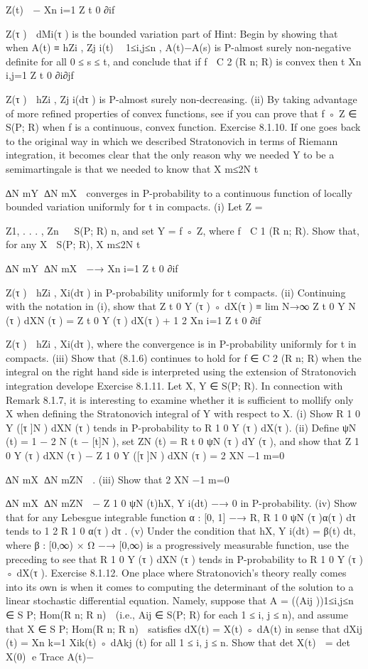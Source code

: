 \documentclass{scrartcl}
\begin{document}
Z(t)

−
Xn
i=1
Z t
0
∂if

Z(τ )

dMi(τ )
is the bounded variation part of 
Hint: Begin by showing that when A(t) ≡
hZi
, Zj i(t)

1≤i,j≤n
, A(t)−A(s)
is P-almost surely non-negative definite for all 0 ≤ s ≤ t, and conclude that
if f ∈ C
2
(R
n; R) is convex then
t
Xn
i,j=1
Z t
0
∂i∂jf

Z(τ )

hZi
, Zj i(dτ )
is P-almost surely non-decreasing.
(ii) By taking advantage of more refined properties of convex functions,
see if you can prove that f ◦ Z ∈ S(P; R) when f is a continuous, convex
function.
Exercise 8.1.10. If one goes back to the original way in which we described
Stratonovich in terms of Riemann integration, it becomes clear that the only
reason why we needed Y to be a semimartingale is that we needed to know
that
X
m≤2N t

∆N
mY
∆N
mX

converges in P-probability to a continuous function of locally bounded variation uniformly for t in compacts.
(i) Let Z =

Z1, . . . , Zn

∈ S(P; R)
n, and set Y = f ◦ Z, where f ∈
C
1
(R
n; R). Show that, for any X ∈ S(P; R),
X
m≤2N t

∆N
mY
∆N
mX

−→ Xn
i=1
Z t
0
∂if

Z(τ )

hZi
, Xi(dτ )
in P-probability uniformly for t compacts.
(ii) Continuing with the notation in (i), show that
Z t
0
Y (τ ) ◦ dX(τ ) ≡ lim
N→∞ Z t
0
Y
N (τ ) dXN (τ )
=
Z t
0
Y (τ ) dX(τ ) + 1
2
Xn
i=1
Z t
0
∂if

Z(τ )

hZi
, Xi(dτ ),
where the convergence is in P-probability uniformly for t in compacts.
(iii) Show that (8.1.6) continues to hold for f ∈ C
2
(R
n; R) when the integral on the right hand side is interpreted using the extension of Stratonovich
integration develope
Exercise 8.1.11. Let X, Y ∈ S(P; R). In connection with Remark 8.1.7,
it is interesting to examine whether it is sufficient to mollify only X when
defining the Stratonovich integral of Y with respect to X.
(i) Show R 1
0
Y ([τ ]N ) dXN (τ ) tends in P-probability to R 1
0
Y (τ ) dX(τ ).
(ii) Define ψN (t) = 1 − 2
N (t − [t]N ), set ZN (t) = R t
0
ψN (τ ) dY (τ ), and
show that
Z 1
0
Y (τ ) dXN (τ ) −
Z 1
0
Y ([τ ]N ) dXN (τ ) =
2
XN −1
m=0

∆N
mX
∆N
mZN

.
(iii) Show that
2
XN −1
m=0

∆N
mX
∆N
mZN

−
Z 1
0
ψN (t)hX, Y i(dt) −→ 0 in P-probability.
(iv) Show that for any Lebesgue integrable function α : [0, 1] −→ R,
R 1
0
ψN (τ )α(τ ) dτ tends to 1
2
R 1
0
α(τ ) dτ .
(v) Under the condition that hX, Y i(dt) = β(t) dt, where β : [0,∞) ×
Ω −→ [0,∞) is a progressively measurable function, use the preceding to see
that R 1
0
Y (τ ) dXN (τ ) tends in P-probability to R 1
0
Y (τ ) ◦ dX(τ ).
Exercise 8.1.12. One place where Stratonovich’s theory really comes into
its own is when it comes to computing the determinant of the solution
to a linear stochastic differential equation. Namely, suppose that A =
((Aij ))1≤i,j≤n ∈ S
P; Hom(R
n; R
n)

(i.e., Aij ∈ S(P; R) for each 1 ≤ i, j ≤
n), and assume that X ∈ S
P; Hom(R
n; R
n)

satisfies dX(t) = X(t) ◦ dA(t)
in sense that
dXij (t) = Xn
k=1
Xik(t) ◦ dAkj (t) for all 1 ≤ i, j ≤ n.
Show that
det
X(t)

= det
X(0)
e
Trace
A(t)−
\end{document}

